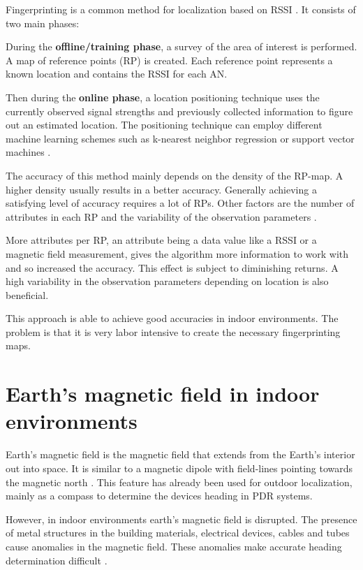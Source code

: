 Fingerprinting is a common method for localization based on RSSI \cite{chapre2013RSSI}. It consists of two main phases:

During the \textbf{offline/training phase}, a survey of the area of interest is performed. A map of reference points (RP) is created. Each reference point represents a known location and contains the RSSI for each AN.

Then during the \textbf{online phase}, a location positioning technique uses the currently observed signal strengths and previously collected information to figure out an estimated location. The positioning technique can employ different machine learning schemes such as k-nearest neighbor regression or support vector machines \cite{JoseMaster,surveyIndoorTechniques}.

The accuracy of this method mainly depends on the density of the RP-map. A higher density usually results in a better accuracy. Generally achieving a satisfying level of accuracy requires a lot of RPs. Other factors are the number of attributes in each RP and the variability of the observation parameters \cite{Li2012feasableMagnetic}.

More attributes per RP, an attribute being a data value like a RSSI or a magnetic field measurement, gives the algorithm more information to work with and so increased the accuracy\cite{Li2012feasableMagnetic}. This effect is subject to diminishing returns\cite{brouwers2014incremental}. A high variability in the observation parameters depending on location is also beneficial.

This approach is able to achieve good accuracies in indoor environments. The problem is that it is very labor intensive to create the necessary fingerprinting maps.

\section{Earth's magnetic field in indoor environments}

Earth's magnetic field is the magnetic field that extends from the Earth's interior out into space. It is similar to a magnetic dipole with field-lines pointing towards the magnetic north \citep{EarthMagnetwikipedia}. This feature has already been used for outdoor localization, mainly as a compass to determine the devices heading in PDR systems.

However, in indoor environments earth's magnetic field is disrupted. The presence of metal structures in the building materials, electrical devices, cables and tubes cause anomalies in the magnetic field. These anomalies make accurate heading determination difficult \citep{afzal2010assessment}.

